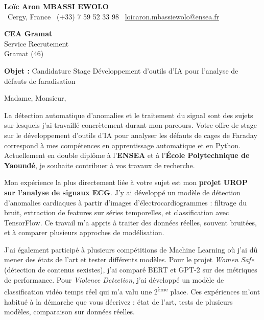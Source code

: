 \documentclass[a4paper,11pt]{article}
\begin{document}
\begin{center}
    {\Large \textbf{Loïc Aron MBASSI EWOLO}}\\[4pt]
    \small
    \faMapMarker\ Cergy, France \quad
    \faPhone\ (+33) 7 59 52 33 98 \quad
    \faEnvelope\ \href{mailto:loicaron.mbassiewolo@ensea.fr}{loicaron.mbassiewolo@ensea.fr}
\end{center}
\vspace{0.5cm}

\hfill
\begin{minipage}[t]{0.45\textwidth}
    \textbf{CEA Gramat}\\
    Service Recrutement\\
    Gramat (46)
\end{minipage}

\vspace{1cm}

\textbf{Objet :} Candidature Stage Développement d'outils d'IA pour l'analyse de défauts de faradisation

\vspace{0.5cm}

Madame, Monsieur,

La détection automatique d'anomalies et le traitement du signal sont des sujets sur lesquels j'ai travaillé concrètement durant mon parcours. Votre offre de stage sur le développement d'outils d'IA pour analyser les défauts de cages de Faraday correspond à mes compétences en apprentissage automatique et en Python. Actuellement en double diplôme à l'\textbf{ENSEA} et à l'\textbf{École Polytechnique de Yaoundé}, je souhaite contribuer à vos travaux de recherche.

Mon expérience la plus directement liée à votre sujet est mon \textbf{projet UROP sur l'analyse de signaux ECG}. J'y ai développé un modèle de détection d'anomalies cardiaques à partir d'images d'électrocardiogrammes : filtrage du bruit, extraction de features sur séries temporelles, et classification avec TensorFlow. Ce travail m'a appris à traiter des données réelles, souvent bruitées, et à comparer plusieurs approches de modélisation.

J'ai également participé à plusieurs compétitions de Machine Learning où j'ai dû mener des états de l'art et tester différents modèles. Pour le projet \textit{Women Safe} (détection de contenus sexistes), j'ai comparé BERT et GPT-2 sur des métriques de performance. Pour \textit{Violence Detection}, j'ai développé un modèle de classification vidéo temps réel qui m'a valu une 2\textsuperscript{ème} place. Ces expériences m'ont habitué à la démarche que vous décrivez : état de l'art, tests de plusieurs modèles, comparaison sur données réelles.
\end{document}
